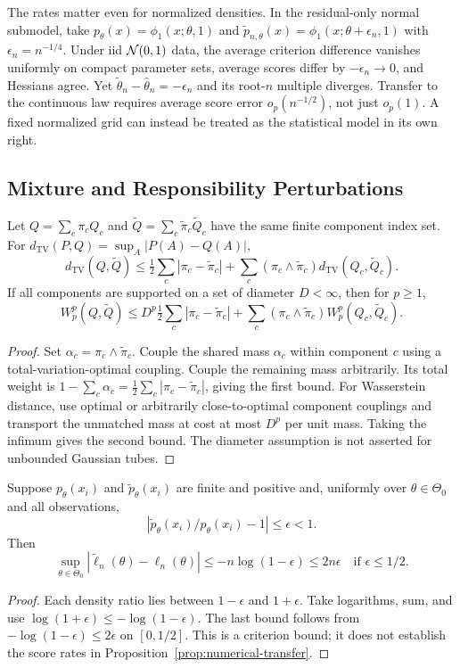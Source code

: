 The rates matter even for normalized densities. In the residual-only normal
submodel, take $p_\theta(x)=\phi_1(x;\theta,1)$ and
$\tilde p_{n,\theta}(x)=\phi_1(x;\theta+\epsilon_n,1)$ with
$\epsilon_n=n^{-1/4}$. Under iid $\mathcal N(0,1)$ data, the average criterion
difference vanishes uniformly on compact parameter sets, average scores
differ by $-\epsilon_n\to0$, and Hessians agree. Yet
$\tilde\theta_n-\hat\theta_n=-\epsilon_n$ and its root-$n$ multiple diverges.
Transfer to the continuous law requires average score error
$o_p(n^{-1/2})$, not just $o_p(1)$. A fixed normalized grid can instead be
treated as the statistical model in its own right.

\subsection{Mixture and Responsibility Perturbations}
\begin{proposition}
\label{prop:mixture-stability}
Let $Q=\sum_c\pi_cQ_c$ and $\tilde Q=\sum_c\tilde\pi_c\tilde Q_c$ have
the same finite component index set. For
$d_{\mathrm{TV}}(P,Q)=\sup_A|P(A)-Q(A)|$,
\[
 d_{\mathrm{TV}}(Q,\tilde Q)\le
 \tfrac12\sum_c|\pi_c-\tilde\pi_c|
 +\sum_c(\pi_c\wedge\tilde\pi_c)d_{\mathrm{TV}}(Q_c,\tilde Q_c).
\]
If all components are supported on a set of diameter $D<\infty$, then for
$p\ge1$,
\[
 W_p^p(Q,\tilde Q)\le
 D^p\tfrac12\sum_c|\pi_c-\tilde\pi_c|
 +\sum_c(\pi_c\wedge\tilde\pi_c)W_p^p(Q_c,\tilde Q_c).
\]
\end{proposition}
\begin{proof}
Set $\alpha_c=\pi_c\wedge\tilde\pi_c$. Couple the shared mass $\alpha_c$
within component $c$ using a total-variation-optimal coupling. Couple the
remaining mass arbitrarily. Its total weight is
$1-\sum_c\alpha_c=\frac12\sum_c|\pi_c-\tilde\pi_c|$, giving the first
bound. For Wasserstein distance, use optimal or arbitrarily close-to-optimal
component couplings and transport the unmatched mass at cost at most $D^p$
per unit mass. Taking the infimum gives the second bound. The diameter
assumption is not asserted for unbounded Gaussian tubes.
\end{proof}

\begin{proposition}
\label{prop:relative-quadrature}
Suppose $p_\theta(x_i)$ and $\tilde p_\theta(x_i)$ are finite and positive
and, uniformly over $\theta\in\Theta_0$ and all observations,
\[
 \left|\tilde p_\theta(x_i)/p_\theta(x_i)-1\right|\le\epsilon<1.
\]
Then
\[
 \sup_{\theta\in\Theta_0}|\tilde\ell_n(\theta)-\ell_n(\theta)|
       \le-n\log(1-\epsilon)\le2n\epsilon
       \quad\text{if }\epsilon\le1/2.
\]
\end{proposition}
\begin{proof}
Each density ratio lies between $1-\epsilon$ and $1+\epsilon$. Take
logarithms, sum, and use $\log(1+\epsilon)\le-\log(1-\epsilon)$.
The last bound follows from $-\log(1-\epsilon)\le2\epsilon$ on $[0,1/2]$.
This is a criterion bound; it does not establish the score rates in
Proposition~\ref{prop:numerical-transfer}.
\end{proof}

